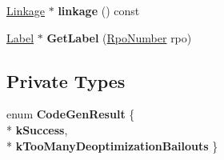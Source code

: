 \begin{DoxyCompactItemize}
\item 
\hyperlink{classv8_1_1internal_1_1compiler_1_1_linkage}{Linkage} $\ast$ {\bfseries linkage} () const \hypertarget{classv8_1_1internal_1_1compiler_1_1_code_generator_ab52b87e098c49f42a2ee0c4fa66435cb}{}\label{classv8_1_1internal_1_1compiler_1_1_code_generator_ab52b87e098c49f42a2ee0c4fa66435cb}

\item 
\hyperlink{classv8_1_1internal_1_1_label}{Label} $\ast$ {\bfseries Get\+Label} (\hyperlink{classv8_1_1internal_1_1compiler_1_1_rpo_number}{Rpo\+Number} rpo)\hypertarget{classv8_1_1internal_1_1compiler_1_1_code_generator_aa2f2a6a082ff9e96f2afc9f19cb195af}{}\label{classv8_1_1internal_1_1compiler_1_1_code_generator_aa2f2a6a082ff9e96f2afc9f19cb195af}

\end{DoxyCompactItemize}
\subsection*{Private Types}
\begin{DoxyCompactItemize}
\item 
enum {\bfseries Code\+Gen\+Result} \{ \\*
{\bfseries k\+Success}, 
\\*
{\bfseries k\+Too\+Many\+Deoptimization\+Bailouts}
 \}\hypertarget{classv8_1_1internal_1_1compiler_1_1_code_generator_ac066372a02c288398a4daa6c74c79693}{}\label{classv8_1_1internal_1_1compiler_1_1_code_generator_ac066372a02c288398a4daa6c74c79693}

\end{DoxyCompactItemize}
